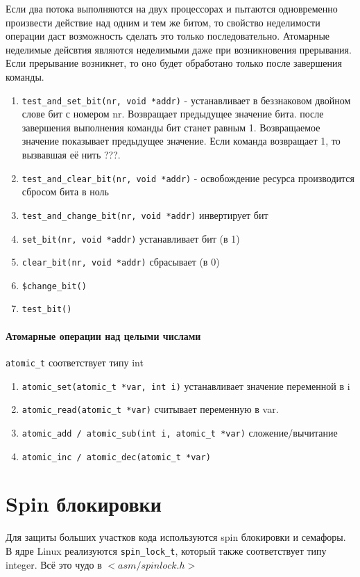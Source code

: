 Если два потока выполняются на двух процессорах и пытаются одновременно произвести действие над одним и тем же битом, то свойство неделимости операции даст возможность сделать это только последовательно. Атомарные неделимые дейсвтия являются неделимыми даже при возникновения прерывания. Если прерывание возникнет, то оно будет обработано только после завершения команды. 
\begin{enumerate}
	\item \verb|test_and_set_bit(nr, void *addr)| - устанавливает в беззнаковом двойном слове бит с номером nr. Возвращает предыдущее значение бита. после завершения выполнения команды бит станет равным 1. Возвращаемое значение показывает предыдущее значение. Если команда возвращает 1, то вызвавшая её нить ???.
	\item \verb|test_and_clear_bit(nr, void *addr)| - освобождение ресурса производится сбросом бита в ноль
	\item \verb|test_and_change_bit(nr, void *addr)| инвертирует бит
	\item \verb|set_bit(nr, void *addr)| устанавливает бит (в 1)
	\item \verb|clear_bit(nr, void *addr)| сбрасывает (в 0)
	\item \verb|$change_bit()|
	\item \verb|test_bit()|
\end{enumerate}

\paragraph{Атомарные операции над целыми числами}
\verb|atomic_t| соответствует типу int
\begin{enumerate}
	\item \verb|atomic_set(atomic_t *var, int i)| устанавливает значение переменной в i
	\item \verb|atomic_read(atomic_t *var)| считывает переменную в var.
	\item \verb|atomic_add / atomic_sub(int i, atomic_t *var)| сложение/вычитание
	\item \verb|atomic_inc / atomic_dec(atomic_t *var)| 
\end{enumerate}

\section{Spin блокировки}

Для защиты больших участков кода используются spin блокировки и семафоры. 
В ядре Linux реализуются \verb|spin_lock_t|, который также соответствует типу integer. Всё это чудо в $<asm/spinlock.h>$  

